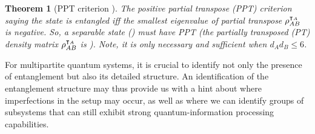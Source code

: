 \documentclass[
aps,
pra,
floatfix,
]{revtex4-2}
\theoremstyle{plain}
\newtheorem{theorem}{Theorem}
\theoremstyle{definition}
\newtheorem{remark}{Remark}
\newcommand{\ppt}{\textup{PPT}}
\newcommand{\dm}{\rho}
\begin{document}
\begin{theorem}[PPT criterion \cite{horodeckiSeparabilityMixedStates1996}]\label{thm:ppt}
	The positive partial transpose (\ppt) criterion saying the state is entangled iff the smallest eigenvalue of partial transpose $\dm_{AB}^{\T_A}$ is negative. 
	So, a separable state () must have PPT (the partially transposed (PT) density matrix $\dm_{AB}^{\T_A}$ is ).
	Note, it is only necessary and sufficient when $d_A d_B \le 6$.
\end{theorem}





For multipartite quantum systems, it is crucial to identify not only the presence of entanglement but also its detailed structure.
An identification of the entanglement structure may thus provide us with a hint about where imperfections in the setup may occur, as well as where we can identify groups of subsystems that can still exhibit strong quantum-information processing capabilities.
\end{document}
